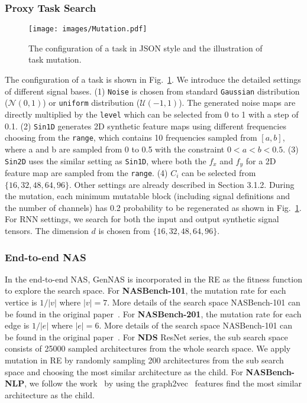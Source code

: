 \documentclass{article}
\begin{document}
\subsubsection{Proxy Task Search}


\begin{figure}[h]
  \centering
  \texttt{[image: images/Mutation.pdf]}
  \caption{The configuration of a task in JSON style and the illustration of task mutation.}
  \label{fig:task_illustration}
\end{figure}

The configuration of a task is shown in Fig.~\ref{fig:task_illustration}. 
We introduce the detailed settings of different signal bases. 
(1) \texttt{Noise} is chosen from standard \texttt{Gaussian} distribution ($\mathcal{N}(0,1)$) or \texttt{uniform} distribution ($\mathcal{U}(-1,1)$). The generated noise maps are directly multiplied by the \texttt{level} which can be selected from 0 to 1 with a step of 0.1. (2) \texttt{Sin1D} generates 2D synthetic feature maps using different frequencies choosing from the \texttt{range}, which contains 10 frequencies sampled from $[a,b]$, where a and b are sampled from 0 to 0.5 with the constraint $0 < a < b < 0.5$. (3) \texttt{Sin2D} uses the similar setting as \texttt{Sin1D}, where both the $f_x$ and $f_y$ for a 2D feature map are sampled from the \texttt{range}. (4) {${C}_i$} can be selected from $\{16,32,48,64,96\}$. Other settings are already described in Section 3.1.2. During the mutation, each minimum mutatable block (including signal definitions and the number of channels) has 0.2 probability to be regenerated as shown in Fig.~\ref{fig:task_illustration}. For RNN settings, we search for both the input and output synthetic signal tensors. The dimension $d$ is chosen from $\{16,32,48,64,96\}$.

\subsubsection{End-to-end NAS}
In the end-to-end NAS, GenNAS is incorporated in the RE as the fitness function to explore the search space. 
For \textbf{NASBench-101}, the mutation rate for each vertice is $1/|v|$ where $|v| = 7$. More details of the search space NASBench-101 can be found in the original paper~\cite{ying2019bench}.
For \textbf{NASBench-201}, the mutation rate for each edge is $1/|e|$ where $|e| = 6$. More details of the search space NASBench-101 can be found in the original paper~\cite{dong2020bench}.
For \textbf{NDS} ResNet series, the sub search space consists of 25000 sampled architectures from the whole search space. 
We apply mutation in RE by randomly sampling 200 architectures from the sub search space and choosing the most similar architecture as the child.
For \textbf{NASBench-NLP}, we follow the work~\cite{klyuchnikov2020bench} by using the graph2vec~\cite{narayanan2017graph2vec} features find the most similar architecture as the child. 
\end{document}
